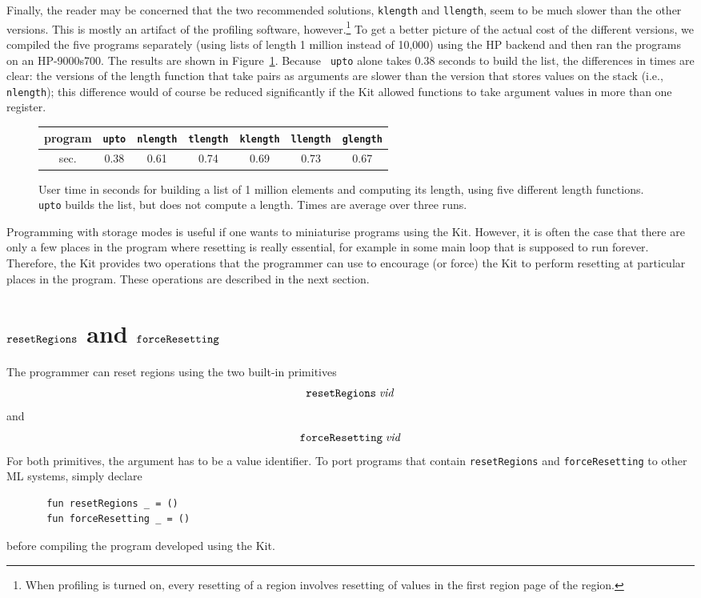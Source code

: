 \documentclass[12pt]{book}
\begin{document}
Finally, the reader may be concerned that the two recommended
solutions, {\tt klength} and {\tt llength}, seem to be much slower
than the other versions. This is mostly an artifact of the profiling
software, however.\footnote{When profiling is turned on, every
  resetting of a region involves resetting of values in the first
  region page of the region.} To get a better picture of the actual
cost of the different versions, we compiled the five programs
separately (using lists of length 1 million instead of 10,000) using
the HP backend and then ran the programs on an HP-9000s700. The
results are shown in Figure~\ref{length.timing.fig}. Because {\tt
  upto} alone takes 0.38 seconds to build the list, the differences in
times are clear: the versions of the length function that take pairs
as arguments are slower than the version that stores values on the
stack (i.e., {\tt nlength}); this difference would of course be
reduced significantly if the Kit allowed functions to take argument
values in more than one register.

\begin{figure}
\begin{center}
\begin{tabular}{|c|c|c|c|c|c|c|}\hline
program      & {\tt upto} & {\tt nlength} & {\tt tlength} & {\tt klength} & {\tt llength} & {\tt glength} \\ \hline
sec. & 0.38 & 0.61 & 0.74 & 0.69 & 0.73 & 0.67 \\ \hline
\end{tabular}
\end{center}
\caption{User time in seconds for building a list of 1 million elements and
computing its length, using five different length functions. {\tt upto} builds
the list, but does not compute a length. Times are average
over three runs.}
\label{length.timing.fig}
\end{figure}

Programming with storage modes is useful if one wants to miniaturise
programs using the Kit. However, it is often the case that there are
only a few places in the program where resetting is really essential,
for example in some main loop that is supposed to run forever.
Therefore, the Kit provides two operations that the programmer can use
to encourage (or force) the Kit to perform resetting at particular
places in the program.  These operations are described in the next
section.

\section{$\hbox{\tt resetRegions}$ and $\hbox{\tt forceResetting}$}
The programmer can reset regions using the two built-in primitives
$$\hbox{\tt resetRegions}\; {\it vid}$$
and 
$$\hbox{\tt forceResetting}\; {\it vid}$$
For both primitives, the argument has to be a value identifier. To port programs that contain {\tt resetRegions}
and {\tt forceResetting} to other ML systems, simply declare
\begin{verbatim}
       fun resetRegions _ = ()
       fun forceResetting _ = ()
\end{verbatim}
before compiling the program developed using the Kit.
\end{document}
